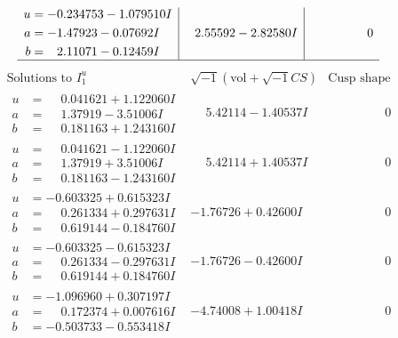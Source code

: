 \documentclass[1p]{elsarticle_modified}
\theoremstyle{definition}
\newcommand{\I}{\sqrt{-1}}
\begin{document}
$$\begin{array}{c|c|c}
\begin{aligned}
u &= -0.234753 - 1.079510 I \\
a &= -1.47923 - 0.07692 I \\
b &= \phantom{-}2.11071 - 0.12459 I\end{aligned}
 & \phantom{-}2.55592 - 2.82580 I & \phantom{-0.000000 } 0\\
 \hline 
 \end{array}$$\newpage$$\begin{array}{c|c|c}  
\text{Solutions to }I^u_{1}& \I (\text{vol} + \sqrt{-1}CS) & \text{Cusp shape}\\
 \hline 
\begin{aligned}
u &= \phantom{-}0.041621 + 1.122060 I \\
a &= \phantom{-}1.37919 - 3.51006 I \\
b &= \phantom{-}0.181163 + 1.243160 I\end{aligned}
 & \phantom{-}5.42114 - 1.40537 I & \phantom{-0.000000 } 0 \\ \hline\begin{aligned}
u &= \phantom{-}0.041621 - 1.122060 I \\
a &= \phantom{-}1.37919 + 3.51006 I \\
b &= \phantom{-}0.181163 - 1.243160 I\end{aligned}
 & \phantom{-}5.42114 + 1.40537 I & \phantom{-0.000000 } 0 \\ \hline\begin{aligned}
u &= -0.603325 + 0.615323 I \\
a &= \phantom{-}0.261334 + 0.297631 I \\
b &= \phantom{-}0.619144 - 0.184760 I\end{aligned}
 & -1.76726 + 0.42600 I & \phantom{-0.000000 } 0 \\ \hline\begin{aligned}
u &= -0.603325 - 0.615323 I \\
a &= \phantom{-}0.261334 - 0.297631 I \\
b &= \phantom{-}0.619144 + 0.184760 I\end{aligned}
 & -1.76726 - 0.42600 I & \phantom{-0.000000 } 0 \\ \hline\begin{aligned}
u &= -1.096960 + 0.307197 I \\
a &= \phantom{-}0.172374 + 0.007616 I \\
b &= -0.503733 - 0.553418 I\end{aligned}
 & -4.74008 + 1.00418 I & \phantom{-0.000000 } 0 \\ \hline\begin{aligned}

\end{aligned}
\end{array}$$
\end{document}
